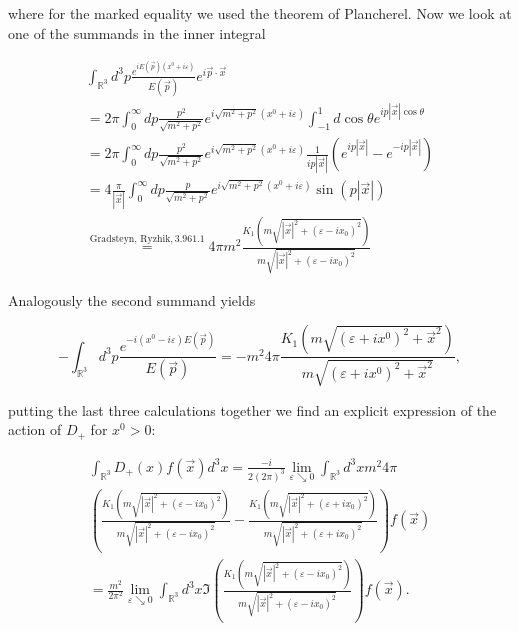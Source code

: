 \documentclass[a4paper,11pt]{article}
\begin{document}
where for the marked equality we used the theorem of Plancherel. Now we look at one of the summands in the inner integral

\begin{align}
\int_{\mathbb{R}^3}d^3p \frac{e^{iE(\vec{p})(x^0+i\varepsilon)}}{E(\vec{p})} e^{i\vec{p}\cdot\vec{x}} \\
= 2\pi \int_0^\infty dp \frac{p^2}{\sqrt{m^2+p^2}} e^{i \sqrt{m^2+p^2}(x^0+i\varepsilon)} \int_{-1}^1 d \cos \theta e^{i p |\vec{x}| \cos \theta}\\
=2\pi \int_0^\infty dp \frac{p^2}{\sqrt{m^2+p^2}} e^{i \sqrt{m^2+p^2}(x^0+i\varepsilon)} \frac{1}{i p |\vec{x}|} \left(e^{i p |\vec{x}|} - e^{-i p |\vec{x}|}\right)\\
=4\frac{\pi}{|\vec{x}|} \int_0^\infty dp \frac{p}{\sqrt{m^2+p^2}} e^{i \sqrt{m^2+p^2}(x^0+i\varepsilon)} \sin( p |\vec{x}|)\\
\overset{\text{Gradsteyn, Ryzhik}, 3.961.1}{=} 4\pi m^2 \frac{K_1\left(m \sqrt{|\vec{x}|^2 + (\varepsilon - i x_0)^2}\right)}{m \sqrt{|\vec{x}|^2 + (\varepsilon - i x_0)^2}}
\end{align}

Analogously the second summand yields 

\begin{equation}
-\int_{\mathbb{R}^3}d^3p \frac{e^{-i(x^0-i\varepsilon)E(\vec{p})}}{E(\vec{p})}= -m^2 4 \pi \frac{K_1\left( m \sqrt{(\varepsilon + i x^0)^2+\vec{x}^2}\right)}{ m \sqrt{(\varepsilon + i x^0)^2+\vec{x}^2}},
\end{equation}

putting the last three calculations together we find an explicit expression of the action of \(D_+\)
for \(x^0>0\):

\begin{align}
\int_{\mathbb{R}^3} D_+(x)f(\vec{x})d^3x= \frac{-i}{2(2\pi)^3} \lim_{\varepsilon \searrow 0} \int_{\mathbb{R}^3} d^3 x  m^2 4\pi \\
\left(\frac{K_1\left(m \sqrt{|\vec{x}|^2 + (\varepsilon - i x_0)^2}\right)}{m \sqrt{|\vec{x}|^2 + (\varepsilon - i x_0)^2}}
-\frac{K_1\left(m \sqrt{|\vec{x}|^2 + (\varepsilon + i x_0)^2}\right)}{m \sqrt{|\vec{x}|^2 + (\varepsilon + i x_0)^2}}
  \right) f(\vec{x})\\
  =\frac{ m^2}{2\pi^2} \lim_{\varepsilon \searrow 0} \int_{\mathbb{R}^3} d^3x \Im\left( \frac{K_1\left(m \sqrt{|\vec{x}|^2 + (\varepsilon - i x_0)^2}\right)}{m \sqrt{|\vec{x}|^2 + (\varepsilon - i x_0)^2}}
  \right) f(\vec{x}).
  \end{align}
\end{document}
